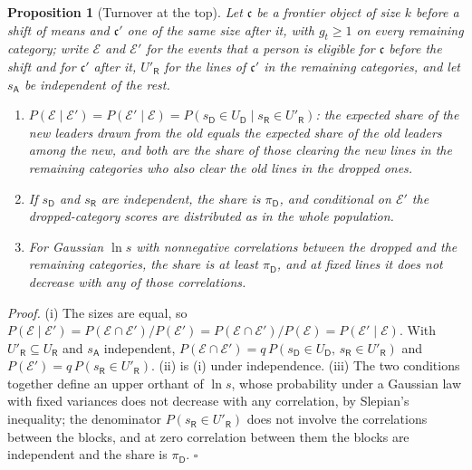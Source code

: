 \documentclass{article}
\newtheorem{proposition}{Proposition}
\begin{document}
\begin{proposition}[Turnover at the top]\label{prop:turnover}
Let $\mathfrak{c}$ be a frontier object of size $k$ before a shift of means and $\mathfrak{c}'$ one of the same size after it, with $g_t \geq 1$ on every remaining category; write $\mathcal{E}$ and $\mathcal{E}'$ for the events that a person is eligible for $\mathfrak{c}$ before the shift and for $\mathfrak{c}'$ after it, $U'_{\mathsf{R}}$ for the lines of $\mathfrak{c}'$ in the remaining categories, and let $s_{\mathsf{A}}$ be independent of the rest.
\begin{enumerate}
  \item[(i)] $P(\mathcal{E} \mid \mathcal{E}') = P(\mathcal{E}' \mid \mathcal{E}) = P(s_{\mathsf{D}} \in U_{\mathsf{D}} \mid s_{\mathsf{R}} \in U'_{\mathsf{R}})$: the expected share of the new leaders drawn from the old equals the expected share of the old leaders among the new, and both are the share of those clearing the new lines in the remaining categories who also clear the old lines in the dropped ones.
  \item[(ii)] If $s_{\mathsf{D}}$ and $s_{\mathsf{R}}$ are independent, the share is $\pi_{\mathsf{D}}$, and conditional on $\mathcal{E}'$ the dropped-category scores are distributed as in the whole population.
  \item[(iii)] For Gaussian $\ln s$ with nonnegative correlations between the dropped and the remaining categories, the share is at least $\pi_{\mathsf{D}}$, and at fixed lines it does not decrease with any of those correlations.
\end{enumerate}
\end{proposition}

\noindent\textit{Proof.} (i) The sizes are equal, so $P(\mathcal{E} \mid \mathcal{E}') = P(\mathcal{E} \cap \mathcal{E}')/P(\mathcal{E}') = P(\mathcal{E} \cap \mathcal{E}')/P(\mathcal{E}) = P(\mathcal{E}' \mid \mathcal{E})$. With $U'_{\mathsf{R}} \subseteq U_{\mathsf{R}}$ and $s_{\mathsf{A}}$ independent, $P(\mathcal{E} \cap \mathcal{E}') = q\,P(s_{\mathsf{D}} \in U_{\mathsf{D}},\, s_{\mathsf{R}} \in U'_{\mathsf{R}})$ and $P(\mathcal{E}') = q\,P(s_{\mathsf{R}} \in U'_{\mathsf{R}})$. (ii) is (i) under independence. (iii) The two conditions together define an upper orthant of $\ln s$, whose probability under a Gaussian law with fixed variances does not decrease with any correlation, by Slepian's inequality; the denominator $P(s_{\mathsf{R}} \in U'_{\mathsf{R}})$ does not involve the correlations between the blocks, and at zero correlation between them the blocks are independent and the share is $\pi_{\mathsf{D}}$. $\square$
\end{document}
